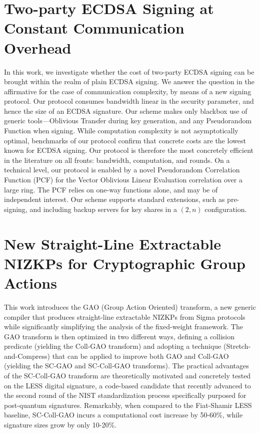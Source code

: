 \documentclass[11pt,oneside]{book}
\theoremstyle{definition}
\theoremstyle{remark}
\theoremstyle{plain}
\begin{document}
\section{\cite{cryptoeprint:2025/1813} Two-party ECDSA Signing at Constant Communication Overhead}
In this work, we investigate whether the cost of two-party ECDSA signing can be brought within the realm of plain ECDSA signing. We answer the question in the affirmative for the case of communication complexity, by means of a new signing protocol. Our protocol consumes bandwidth linear in the security parameter, and hence the size of an ECDSA signature. Our scheme makes only blackbox use of generic tools---Oblivious Transfer during key generation, and any Pseudorandom Function when signing. While computation complexity is not asymptotically optimal, benchmarks of our protocol confirm that concrete costs are the lowest known for ECDSA signing. Our protocol is therefore the most concretely efficient in the literature on all fronts: bandwidth, computation, and rounds. On a technical level, our protocol is enabled by a novel Pseudorandom Correlation Function (PCF) for the Vector Oblivious Linear Evaluation correlation over a large ring. The PCF relies on one-way functions alone, and may be of independent interest. Our scheme supports standard extensions, such as pre-signing, and including backup servers for key shares in a $(2,n)$ configuration.

\section{\cite{cryptoeprint:2025/1819} New Straight-Line Extractable NIZKPs for Cryptographic Group Actions}
This work introduces the GAO (Group Action Oriented) transform, a new generic compiler that produces straight-line extractable NIZKPs from Sigma protocols while significantly simplifying the analysis of the fixed-weight framework. The GAO transform is then optimized in two different ways, defining a collision predicate (yielding the Coll-GAO transform) and adopting a technique (Stretch-and-Compress) that can be applied to improve both GAO and Coll-GAO (yielding the SC-GAO and SC-Coll-GAO transforms). The practical advantages of the SC-Coll-GAO transform are theoretically motivated and concretely tested on the LESS digital signature, a code-based candidate that recently advanced to the second round of the NIST standardization process specifically purposed for post-quantum signatures. Remarkably, when compared to the Fiat-Shamir LESS baseline, SC-Coll-GAO incurs a computational cost increase by 50-60\%, while signature sizes grow by only 10-20\%.
\end{document}
